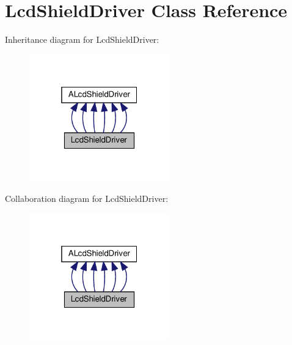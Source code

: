 \hypertarget{classLcdShieldDriver}{}\section{Lcd\+Shield\+Driver Class Reference}
\label{classLcdShieldDriver}


Inheritance diagram for Lcd\+Shield\+Driver\+:
\nopagebreak
\begin{figure}[H]
\begin{center}
\leavevmode
\includegraphics[width=172pt]{classLcdShieldDriver__inherit__graph}
\end{center}
\end{figure}


Collaboration diagram for Lcd\+Shield\+Driver\+:
\nopagebreak
\begin{figure}[H]
\begin{center}
\leavevmode
\includegraphics[width=172pt]{classLcdShieldDriver__coll__graph}
\end{center}
\end{figure}

